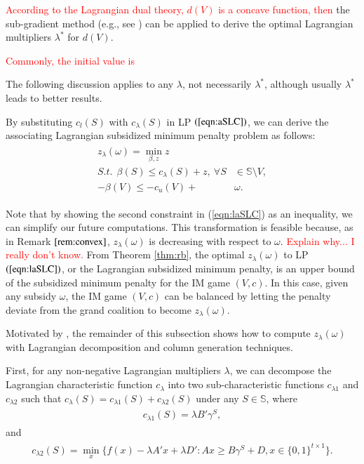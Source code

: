 \documentclass[authoryear,review,12pt]{elsarticle}
\begin{document}
\textcolor{red}{According to the Lagrangian dual theory, $d(V)$ is a concave function, then}
the sub-gradient method (e.g., see \citealt{Ahuja1993NetworkBook}) can be applied to derive the optimal Lagrangian multipliers $\lambda^*$ for $d(V)$.
\textcolor{red}{Commonly, the initial value is

}
The following discussion applies to any $\lambda$, not necessarily $\lambda^*$, although usually $\lambda^*$ leads to better results.

By substituting $c_l(S)$ with $c_{\lambda}(S)$ in LP $(\ref{eqn:aSLC})$, we can derive the associating Lagrangian subsidized minimum penalty problem as follows:
\begin{eqnarray}\label{eqn:laSLC}
\begin{aligned}
z_{\lambda}(\omega) = \min_{\beta,z} z~~&\\
S.t.~~ \beta(S) \leq  c_{\lambda}(S) + z,~ \forall S &\in \mathbb{S} \setminus V,\\
-\beta(V) \leq -  c_u(V)+&\omega.
\end{aligned}
\end{eqnarray}

Note that by showing the second constraint in (\ref{eqn:laSLC}) as an inequality, we can simplify our future computations. This transformation is feasible because, as in Remark $\ref{rem:convex}$, $z_{\lambda}(\omega)$ is decreasing with respect to $\omega$.
\textcolor{red}{Explain why... I really don't know.}
From Theorem \ref{thm:rb}, %
the optimal $z_{\lambda}(\omega)$ to LP $(\ref{eqn:laSLC})$, or the Lagrangian subsidized minimum penalty, is an upper bound of the subsidized minimum penalty for the IM game $(V,c)$.
In this case, given any subsidy $\omega$, the IM game $(V,c)$ can be balanced by letting the penalty deviate from the grand coalition to become $z_{\lambda}(\omega)$. %


Motivated by \cite{LRCA2016}, the remainder of this subsection shows how to compute $z_{\lambda}(\omega)$ with Lagrangian decomposition and column generation techniques.


First, for any non-negative Lagrangian multipliers $\lambda$, we can decompose the Lagrangian characteristic function $c_{\lambda}$ into two sub-characteristic functions $c_{\lambda1}$ and $c_{\lambda2}$ such that $c_{\lambda}(S) = c_{\lambda1}(S) + c_{\lambda2}(S)$ under any $S \in \mathbb{S}$, where
\begin{eqnarray*}\label{eqn:subcf1}
\begin{aligned}
c_{\lambda1}(S) = \lambda  B'\gamma^S,
\end{aligned}
\end{eqnarray*}
 and
 \begin{eqnarray*}\label{eqn:subcf2}
\begin{aligned}
c_{\lambda2}(S) = \min_x \bigg\{ f(x)-\lambda A'x  + \lambda D':Ax \geq B\gamma^S + D, x \in \{0,1\}^{t \times 1} \bigg\}.
\end{aligned}
\end{eqnarray*}
\end{document}
